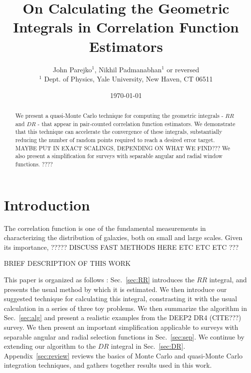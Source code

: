 \documentclass[usenatbib]{mn2e}
\begin{document}
\topmargin-1cm

\newcommand{\vx}{{\bm x}}
\newcommand{\vr}{{\bm r}}
\newcommand{\vdx}{{\bm dx}}
\newcommand{\vy}{{\bm y}}
\newcommand{\bin}{\Theta}


\title[Geometric Integrals for Correlation Functions]
{On Calculating the Geometric Integrals in Correlation Function Estimators}
\author[Parejko\&Padmanabhan]{John Parejko$^{1}$, Nikhil Padmanabhan$^{1}$ or
reversed \\
$^{1}$ Dept. of Physics, Yale University, New Haven, CT 06511 \\
}

\date{\today}
\maketitle

\begin{abstract}
  We present a quasi-Monte Carlo technique for computing the geometric integrals - $RR$ and $DR$ - that appear
  in pair-counted correlation function estimators. We demonstrate that this technique can accelerate the convergence of
  these integrals, substantially reducing the number of random points required
  to reach a desired error target. MAYBE PUT IN EXACT SCALINGS, DEPENDING ON
  WHAT WE FIND??? We also present a simplification for surveys with separable
  angular and radial window functions. ????
\end{abstract}

\section{Introduction}

The correlation function is one of the fundamental measurements in
characterizing the distribution of galaxies, both on small and large scales.
Given its importance, ????? DISCUSS FAST METHODS HERE ETC ETC ETC ???

BRIEF DESCRIPTION OF THIS WORK

This paper is organized as follows : Sec.~\ref{sec:RR} introduces the $RR$
integral, and presents the usual method by which it is estimated. We then
introduce our suggested technique for calculating this integral, constrasting it
with the usual calculation in a series of three toy problems. We then summarize
the algorithm in Sec.~\ref{sec:alg} and present a realistic examples from
the DEEP2 DR4 (CITE???) survey. We then present an
important simplification applicable to surveys with separable 
angular and radial selection functions in Sec.~\ref{sec:sep}.
We continue by extending our algorithm to the $DR$ integral in
Sec.~\ref{sec:DR}. Appendix~\ref{sec:review} reviews the basics of Monte Carlo and quasi-Monte
Carlo integration techniques, and gathers together results used in this work.
\end{document}
